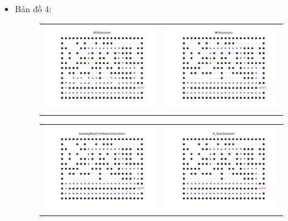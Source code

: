 \documentclass[11pt]{article} %
\begin{document}
\begin{itemize}
	
	\newpage
	\item Bản đồ 4:
	\begin{figure}[h] \label{bd4}
		\centering
		\begin{tabular}{cc}
			\includegraphics[width=8cm]{Figures/fg4_dfs.png} &
			\includegraphics[width=8cm]{Figures/fg4_bfs.png} \\
		\end{tabular}
	\end{figure}
	\begin{figure}[h] \label{Hình 4}
		\centering
		\begin{tabular}{cc}
			\includegraphics[width=8cm]{Figures/fg4_gbfs.png} &
			\includegraphics[width=8cm]{Figures/fg4_astar.png}

\end{tabular}
\end{figure}
\end{itemize}
\end{document}
